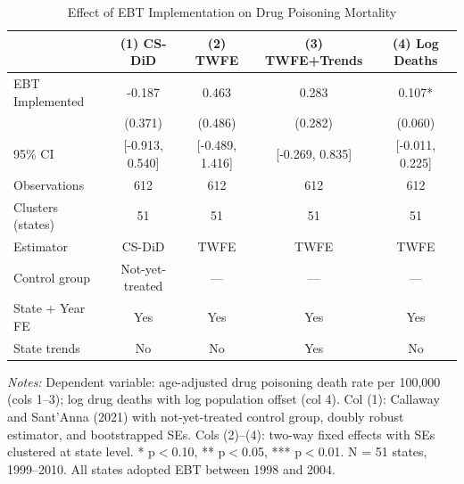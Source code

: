 \begin{table}[H]
\centering
\caption{Effect of EBT Implementation on Drug Poisoning Mortality}
\label{tab:main}
\small
\begin{threeparttable}
\begin{tabular}{lcccc}
\toprule
& (1) CS-DiD & (2) TWFE & (3) TWFE+Trends & (4) Log Deaths \\
\midrule
EBT Implemented & -0.187 & 0.463 & 0.283 & 0.107* \\
& (0.371) & (0.486) & (0.282) & (0.060) \\
95\% CI & [-0.913, 0.540] & [-0.489, 1.416] & [-0.269, 0.835] & [-0.011, 0.225] \\
\midrule
Observations & 612 & 612 & 612 & 612 \\
Clusters (states) & 51 & 51 & 51 & 51 \\
Estimator & CS-DiD & TWFE & TWFE & TWFE \\
Control group & Not-yet-treated & --- & --- & --- \\
State + Year FE & Yes & Yes & Yes & Yes \\
State trends & No & No & Yes & No \\
\bottomrule
\end{tabular}
\begin{tablenotes}[flushleft]
\footnotesize
\item \textit{Notes:} Dependent variable: age-adjusted drug poisoning death rate per 100,000 (cols 1--3); log drug deaths with log population offset (col 4). Col (1): Callaway and Sant'Anna (2021) with not-yet-treated control group, doubly robust estimator, and bootstrapped SEs. Cols (2)--(4): two-way fixed effects with SEs clustered at state level. * p$<$0.10, ** p$<$0.05, *** p$<$0.01. N = 51 states, 1999--2010. All states adopted EBT between 1998 and 2004.
\end{tablenotes}
\end{threeparttable}
\end{table}
